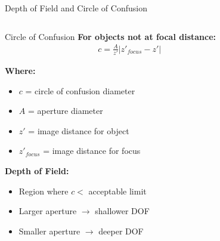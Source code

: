 \begin{frame}{Depth of Field and Circle of Confusion}
    \begin{columns}
        \begin{column}{0.5\textwidth}
            \begin{mathbox}{Circle of Confusion}
                \textbf{For objects not at focal distance:}
                \begin{align}
                    c = \frac{A}{z'} \left| z'_{focus} - z' \right|
                \end{align}

                \textbf{Where:}
                \begin{itemize}
                    \item $c$ = circle of confusion diameter
                    \item $A$ = aperture diameter
                    \item $z'$ = image distance for object
                    \item $z'_{focus}$ = image distance for focus
                \end{itemize}

                \vspace{0.3cm}
                \textbf{Depth of Field:}
                \begin{itemize}
                    \item Region where $c < $ acceptable limit
                    \item Larger aperture $\rightarrow$ shallower DOF
                    \item Smaller aperture $\rightarrow$ deeper DOF
                \end{itemize}
            \end{mathbox}
        \end{column}
        \begin{column}{0.5\textwidth}
\end{column}
\end{columns}
\end{frame}
